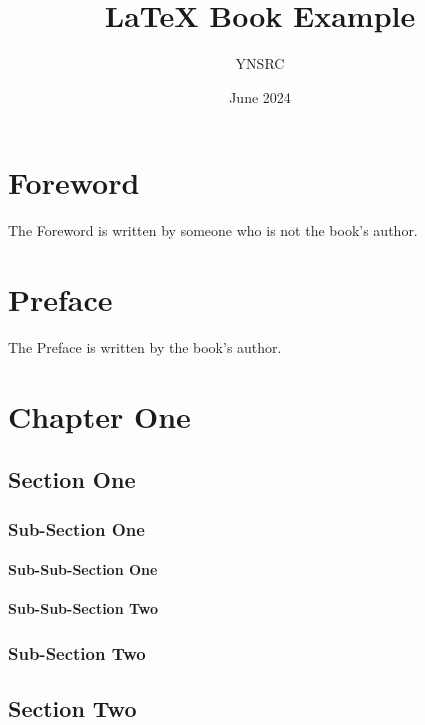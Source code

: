 \documentclass[12pt, twoside]{book}
\title{\LaTeX{} Book Example}
\author{YNSRC}
\date{June 2024}
\begin{document}
\maketitle

\frontmatter %
\chapter*{Foreword}
The Foreword is written by someone who is not the book's author.

\chapter*{Preface}
The Preface is written by the book's author.

\tableofcontents

\mainmatter

\chapter{Chapter One}

\section{Section One}
\blindtext[2]

\subsection{Sub-Section One}
\blindtext[3]

\subsubsection{Sub-Sub-Section One}
\blindtext[4]

\subsubsection{Sub-Sub-Section Two}
\blindtext[2]

\subsection{Sub-Section Two}
\blindtext[2]

\section{Section Two}
\blindtext[3]
\end{document}
